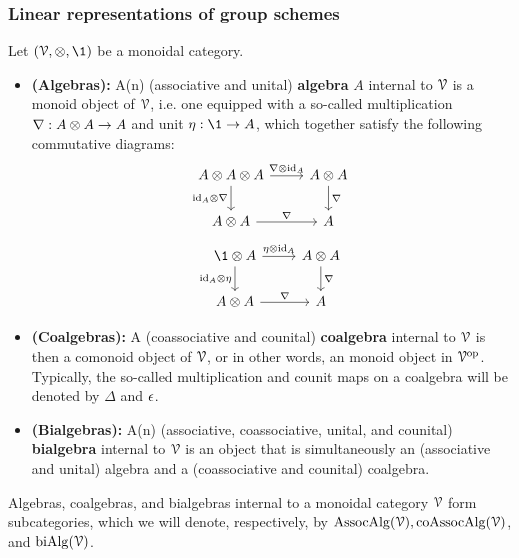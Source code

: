         \subsubsection{Linear representations of group schemes}
            \begin{definition} \label{def: algebras_coalgebras_and_bialgebras} 
                Let $(\calV, \tensor, \1)$ be a monoidal category. 
                    \begin{itemize}
                        \item \textbf{(Algebras):} A(n) (associative and unital) \textbf{algebra} $A$ internal to $\mathcal{V}$ is a monoid object of $\mathcal{V}$, i.e. one equipped with a so-called multiplication $\nabla: A \tensor A \to A$ and unit $\eta: \1 \to A$, which together satisfy the following commutative diagrams:
                            $$
                                \begin{tikzcd}
                                	{A \tensor A \tensor A} & {A \tensor A} \\
                                	{A \tensor A} & {A}
                                	\arrow["{\id_A \tensor \nabla}"', from=1-1, to=2-1]
                                	\arrow["{\nabla}", from=2-1, to=2-2]
                                	\arrow["{\nabla \tensor \id_A}", from=1-1, to=1-2]
                                	\arrow["{\nabla}", from=1-2, to=2-2]
                                \end{tikzcd}
                            $$
                            $$
                                \begin{tikzcd}
                                	{\1 \tensor A} & {A \tensor A} \\
                                	{A \tensor A} & {A}
                                	\arrow["{\nabla}", from=1-2, to=2-2]
                                	\arrow["{\nabla}", from=2-1, to=2-2]
                                	\arrow["{\id_A \tensor \eta}"', from=1-1, to=2-1]
                                	\arrow["{\eta \tensor \id_A}", from=1-1, to=1-2]
                                \end{tikzcd}
                            $$
                        \item \textbf{(Coalgebras):} A (coassociative and counital) \textbf{coalgebra} internal to $\mathcal{V}$ is then a comonoid object of $\mathcal{V}$, or in other words, an monoid object in $\mathcal{V}^{\mathrm{op}}$. Typically, the so-called multiplication and counit maps on a coalgebra will be denoted by $\Delta$ and $\epsilon$.
                        \item \textbf{(Bialgebras):} A(n) (associative, coassociative, unital, and counital) \textbf{bialgebra} internal to $\mathcal{V}$ is an object that is simultaneously an (associative and unital) algebra and a (coassociative and counital) coalgebra.
                    \end{itemize}
                Algebras, coalgebras, and bialgebras internal to a monoidal category $\mathcal{V}$ form subcategories, which we will denote, respectively, by $\mathrm{Assoc}\mathrm{Alg}(\mathcal{V}), \mathrm{co}\mathrm{Assoc}\mathrm{Alg}(\mathcal{V})$, and $\mathrm{bi}\mathrm{Alg}(\mathcal{V})$.
            \end{definition}
